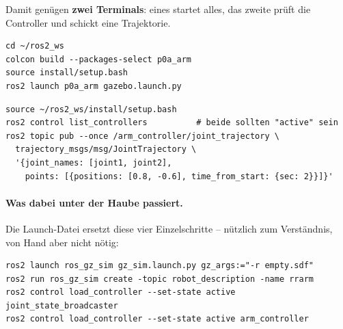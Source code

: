 \noindent Damit genügen \textbf{zwei Terminals}: eines startet alles, das zweite
prüft die Controller und schickt eine Trajektorie.
\begin{lstlisting}[style=bash,caption={Terminal 1 -- bauen, sourcen, alles starten}]
cd ~/ros2_ws
colcon build --packages-select p0a_arm
source install/setup.bash
ros2 launch p0a_arm gazebo.launch.py
\end{lstlisting}
\begin{lstlisting}[style=bash,caption={Terminal 2 -- Controller prüfen und Arm kommandieren}]
source ~/ros2_ws/install/setup.bash
ros2 control list_controllers          # beide sollten "active" sein
ros2 topic pub --once /arm_controller/joint_trajectory \
  trajectory_msgs/msg/JointTrajectory \
  '{joint_names: [joint1, joint2],
    points: [{positions: [0.8, -0.6], time_from_start: {sec: 2}}]}'
\end{lstlisting}

\paragraph{Was dabei unter der Haube passiert.} Die Launch-Datei ersetzt diese
vier Einzelschritte -- nützlich zum Verständnis, von Hand aber nicht nötig:
\begin{lstlisting}[style=bash,caption={Äquivalente Einzelbefehle}]
ros2 launch ros_gz_sim gz_sim.launch.py gz_args:="-r empty.sdf"
ros2 run ros_gz_sim create -topic robot_description -name rrarm
ros2 control load_controller --set-state active joint_state_broadcaster
ros2 control load_controller --set-state active arm_controller
\end{lstlisting}
